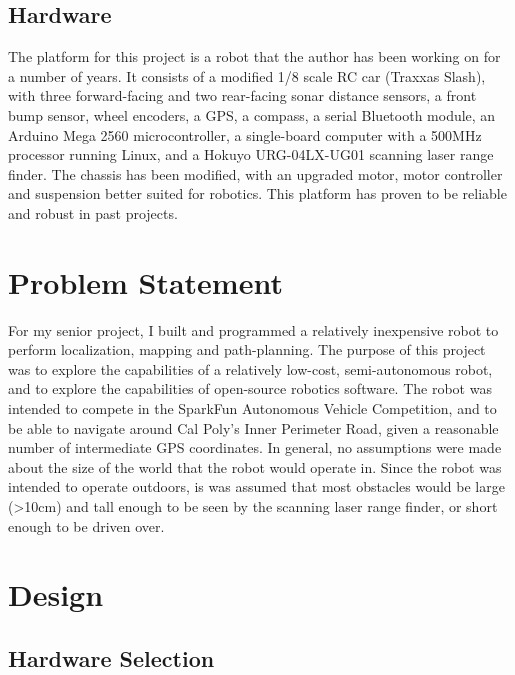 \documentclass[a4paper,12pt]{article}
\begin{document}
\subsection{Hardware}
The platform for this project is a robot that the author has been working on for a number of years. It consists of a modified 1/8 scale RC car (Traxxas Slash\cite{traxxas}), with three forward-facing and two rear-facing sonar distance sensors, a front bump sensor, wheel encoders, a GPS, a compass, a serial Bluetooth module, an Arduino Mega 2560 microcontroller, a single-board computer with a 500MHz processor running Linux, and a Hokuyo URG-04LX-UG01 scanning laser range finder. The chassis has been modified, with an upgraded motor, motor controller and suspension better suited for robotics. This platform has proven to be reliable and robust in past projects.

\section{Problem Statement}
For my senior project, I built and programmed a relatively inexpensive robot to perform localization, mapping and path-planning. The purpose of this project was to explore the capabilities of a relatively low-cost, semi-autonomous robot, and to explore the capabilities of open-source robotics software. The robot was intended to compete in the SparkFun Autonomous Vehicle Competition\cite{avc}, and to be able to navigate around Cal Poly's Inner Perimeter Road, given a reasonable number of intermediate GPS coordinates. In general, no assumptions were made about the size of the world that the robot would operate in. Since the robot was intended to operate outdoors, is was assumed that most obstacles would be large (\textgreater10cm) and tall enough to be seen by the scanning laser range finder, or short enough to be driven over.

\section{Design}
\subsection{Hardware Selection}

\end{document}
